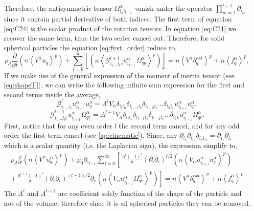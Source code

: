 {Therefore, the antisymmetric tensor $\Omega_{i_ki_{l+1}}^\alpha$ vanish under the operator $\prod^{l+1}_{m=1} \partial_{i_m}$ since it contain partial derivative of both indices.
The first term of equation \ref{eq:C24} is the scalar product of the rotation tensors.
In equation \ref{eq:C21} we recover the same term, thus the two series cancel out.
Therefore, for solid spherical particles the equation \ref{eq:first_order} reduce to,
\begin{equation*}
    \rho_d \frac{\partial}{\partial t} \left(n\left<V^\alpha u_q\right>^p\right)
    +\sum_{l=0}^\infty \left[
        \left(n
        \left<
            \mathcal{G}_{i_1\ldots i_l e}^{l+1} u^\alpha_{i_{l+1}}\Omega_{qp}^\alpha
        \right>^p\right)
    \right]
    = n \left<V^\alpha b^{ext}_q\right>^p
    + n\left<f_q^\alpha\right>^p,
\end{equation*}
If we make use of the general expression of the moment of inertia tensor (see \ref{eq:shapeT}), we can write the following infinite sum expression for the first and second terms inside the average, 
\begin{equation*}
    \mathcal{G}_{i_1\ldots i_l}^l u^\alpha_{i_{l+1}} u^\alpha_q
    = A^l V_\alpha
    \delta_{i_l i_a}
    \delta_{i_{l-1} i_b}
    \delta_{i_{l-2} i_c}
    \ldots
    \delta_{i_2i_1}
    u^\alpha_{i_{l+1}} u^\alpha_q,
\end{equation*}
\begin{equation*}
    \mathcal{G}_{i_1\ldots i_l e}^{l+1} u^\alpha_{i_{l+1}}\Omega_{qe}^\alpha
    = A^{l+1} V_\alpha
    \delta_{i_l i_a}
    \delta_{i_{l-1} i_b}
    \delta_{i_{l-2} i_c}
    \ldots
    \delta_{i_1e}
    u^\alpha_{i_{l+1}}\Omega_{qe}^\alpha.
\end{equation*}
First, notice that for any even order $l$ the second term cancel, and for any odd order the first term cancel (see \ref{ap:cinematic}). 
Since, any $\partial_{i_e} \partial_{i_m} \delta_{i_ei_m} = \partial_{i_e}\partial_{i_e}$ which is a scalar quantity (i.e. the Laplacian sign), the expression simplify to,
\begin{multline*}
    \rho_d \frac{\partial}{\partial t} \left(n\left<V^\alpha u_q^\alpha\right>^p\right)
    +\rho_d\partial_{i_{l+1}} \sum_{l=0}^\infty 
    \left[
        \frac{A^l(-1)^l}{l!}
        (\partial_i\partial_i)^{l/2}
        \left(n 
        \left<V_\alpha u^\alpha_{i_{l+1}} u^\alpha_q \right>^p
        \right)
     \right.\\
     \left.
        +
        \frac{A^{l+1}(-1)^l}{l!}
        (\partial_i\partial_i)^{(l-1)/2}\partial_e 
        \left(n 
        \left<V_\alpha u^\alpha_{i_{l+1}}\Omega_{qe}^\alpha \right>^p
        \right)
    \right]
    = n \left<V^\alpha b^{ext}_q\right>^p
    + n\left<f_q^\alpha\right>^p
\end{multline*}
The $A^l$ and $A^{l+1}$ are coefficient solely function of the shape of the particle and not of the volume, therefore since it is all spherical particles they can be removed. 

}
